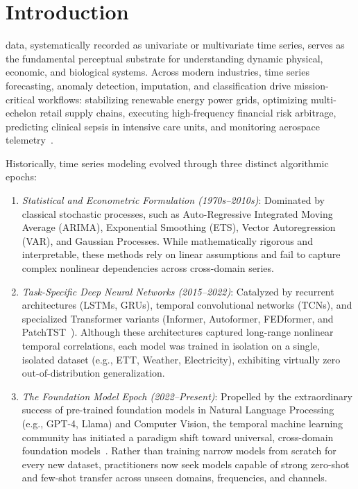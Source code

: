 \section{Introduction}
\label{sec:intro}

 data, systematically recorded as univariate or multivariate time series, serves as the fundamental perceptual substrate for understanding dynamic physical, economic, and biological systems. Across modern industries, time series forecasting, anomaly detection, imputation, and classification drive mission-critical workflows: stabilizing renewable energy power grids, optimizing multi-echelon retail supply chains, executing high-frequency financial risk arbitrage, predicting clinical sepsis in intensive care units, and monitoring aerospace telemetry~\cite{jin2023largemodels}.

Historically, time series modeling evolved through three distinct algorithmic epochs:
\begin{enumerate}[leftmargin=*]
    \item \emph{Statistical and Econometric Formulation (1970s--2010s)}: Dominated by classical stochastic processes, such as Auto-Regressive Integrated Moving Average (ARIMA), Exponential Smoothing (ETS), Vector Autoregression (VAR), and Gaussian Processes. While mathematically rigorous and interpretable, these methods rely on linear assumptions and fail to capture complex nonlinear dependencies across cross-domain series.
    \item \emph{Task-Specific Deep Neural Networks (2015--2022)}: Catalyzed by recurrent architectures (LSTMs, GRUs), temporal convolutional networks (TCNs), and specialized Transformer variants (Informer, Autoformer, FEDformer, and PatchTST~\cite{nie2023patchtst}). Although these architectures captured long-range nonlinear temporal correlations, each model was trained in isolation on a single, isolated dataset (e.g., ETT, Weather, Electricity), exhibiting virtually zero out-of-distribution generalization.
    \item \emph{The Foundation Model Epoch (2022--Present)}: Propelled by the extraordinary success of pre-trained foundation models in Natural Language Processing (e.g., GPT-4, Llama) and Computer Vision, the temporal machine learning community has initiated a paradigm shift toward universal, cross-domain foundation models~\cite{ansari2024chronos,das2024timesfm,woo2024moirai}. Rather than training narrow models from scratch for every new dataset, practitioners now seek models capable of strong zero-shot and few-shot transfer across unseen domains, frequencies, and channels.
\end{enumerate}

